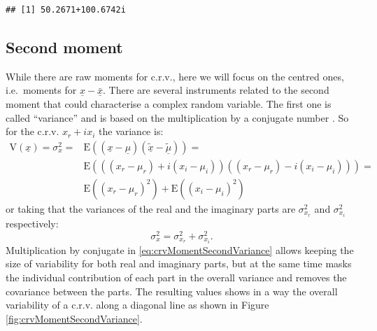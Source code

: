 \documentclass[
]{book}
\begin{document}
\begin{verbatim}
## [1] 50.2671+100.6742i
\end{verbatim}

\hypertarget{crvSecondMoment}{%
\subsection{Second moment}\label{crvSecondMoment}}

While there are raw moments for c.r.v., here we will focus on the centred ones, i.e.~moments for \(\underline{x}-\bar{\underline{x}}\). There are several instruments related to the second moment that could characterise a complex random variable. The first one is called ``variance'' and is based on the multiplication by a conjugate number \citep{reference}. So for the c.r.v. \(x_r + i x_i\) the variance is:
\begin{equation}
    \begin{aligned}
    \mathrm{V}(\underline{x}) = \sigma_x^2 = & \mathrm{E}((\underline{x}-\underline{\mu}) (\tilde{\underline{x}}-\tilde{\underline{\mu}})) = \\
                 & \mathrm{E}\left(((x_r-\mu_{r}) + i (x_i-\mu_{i}))((x_r-\mu_{r}) - i (x_i-\mu_{i}))\right) = \\
                 & \mathrm{E}((x_r-\mu_{r})^2) +  \mathrm{E}((x_i-\mu_{i})^2)
    \end{aligned}
    \label{eq:crvMomentSecondVariance}
\end{equation}
or taking that the variances of the real and the imaginary parts are \(\sigma_{x_r}^2\) and \(\sigma_{x_i}^2\) respectively:
\begin{equation}
    \sigma_x^2 = \sigma_{x_r}^2 + \sigma_{x_i}^2.
    \label{eq:crvMomentSecondVarianceShort}
\end{equation}
Multiplication by conjugate in \eqref{eq:crvMomentSecondVariance} allows keeping the size of variability for both real and imaginary parts, but at the same time masks the individual contribution of each part in the overall variance and removes the covariance between the parts. The resulting values shows in a way the overall variability of a c.r.v. along a diagonal line as shown in Figure \ref{fig:crvMomentSecondVariance}.
\end{document}
